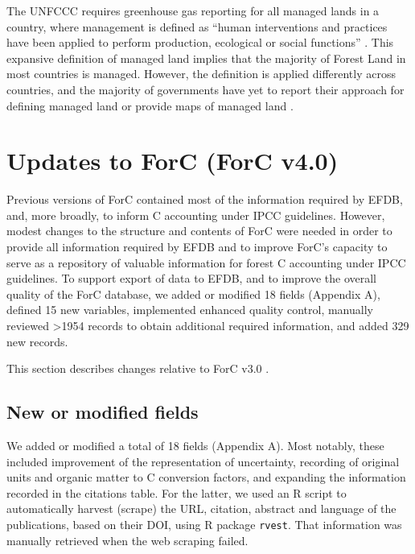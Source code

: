 \documentclass[, manuscript]{copernicus}
\begin{document}
The UNFCCC requires greenhouse gas reporting for all managed lands in a
country, where management is defined as ``human interventions and
practices have been applied to perform production, ecological or social
functions'' \citep{ipcc_2006_2006}. This expansive definition of managed
land implies that the majority of Forest Land in most countries is
managed. However, the definition is applied differently across
countries, and the majority of governments have yet to report their
approach for defining managed land or provide maps of managed land
\citep{ogle_delineating_2018, deng_comparing_2021}.

\section{Updates to ForC (ForC v4.0)}

Previous versions of ForC
\citep{anderson-teixeira_carbon_2016, anderson-teixeira_forc_2018, anderson-teixeira_carbon_2021}
contained most of the information required by EFDB, and, more broadly,
to inform C accounting under IPCC guidelines. However, modest changes to
the structure and contents of ForC were needed in order to provide all
information required by EFDB and to improve ForC's capacity to serve as
a repository of valuable information for forest C accounting under IPCC
guidelines. To support export of data to EFDB, and to improve the
overall quality of the ForC database, we added or modified 18 fields
(Appendix A), defined 15 new variables, implemented enhanced quality
control, manually reviewed \textgreater1954 records to obtain additional
required information, and added 329 new records.

This section describes changes relative to ForC v3.0
\citep{anderson-teixeira_carbon_2021}.

\subsection{New or modified fields}

We added or modified a total of 18 fields (Appendix A). Most notably,
these included improvement of the representation of uncertainty,
recording of original units and organic matter to C conversion factors,
and expanding the information recorded in the citations table. For the
latter, we used an R script to automatically harvest (scrape) the URL,
citation, abstract and language of the publications, based on their DOI,
using R package \texttt{rvest}\citep{wickham_rvest_2022}. That
information was manually retrieved when the web scraping failed.
\end{document}
